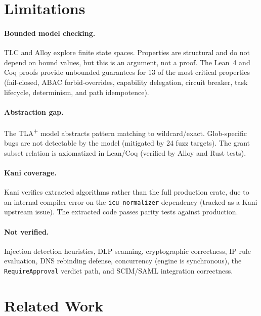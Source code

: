 \documentclass[sigplan,screen,nonacm]{acmart}
\newcommand{\tlaplus}{TLA\textsuperscript{+}\xspace}
\begin{document}
\section{Limitations}
\label{sec:limitations}

\paragraph{Bounded model checking.} TLC and Alloy explore finite state
spaces. Properties are structural and do not depend on bound values, but
this is an argument, not a proof. The Lean~4 and Coq proofs provide
unbounded guarantees for 13 of the most critical properties (fail-closed,
ABAC forbid-overrides, capability delegation, circuit breaker, task
lifecycle, determinism, and path idempotence).

\paragraph{Abstraction gap.} The \tlaplus model abstracts pattern matching
to wildcard/exact. Glob-specific bugs are not detectable by the model
(mitigated by 24 fuzz targets). The grant subset relation is axiomatized
in Lean/Coq (verified by Alloy and Rust tests).

\paragraph{Kani coverage.} Kani verifies extracted algorithms rather than
the full production crate, due to an internal compiler error on the
\texttt{icu\_normalizer} dependency (tracked as a Kani upstream issue). The
extracted code passes parity tests against production.

\paragraph{Not verified.} Injection detection heuristics, DLP scanning,
cryptographic correctness, IP rule evaluation, DNS rebinding defense,
concurrency (engine is synchronous), the \texttt{RequireApproval} verdict
path, and SCIM/SAML integration correctness.


\section{Related Work}
\label{sec:related}
\end{document}
